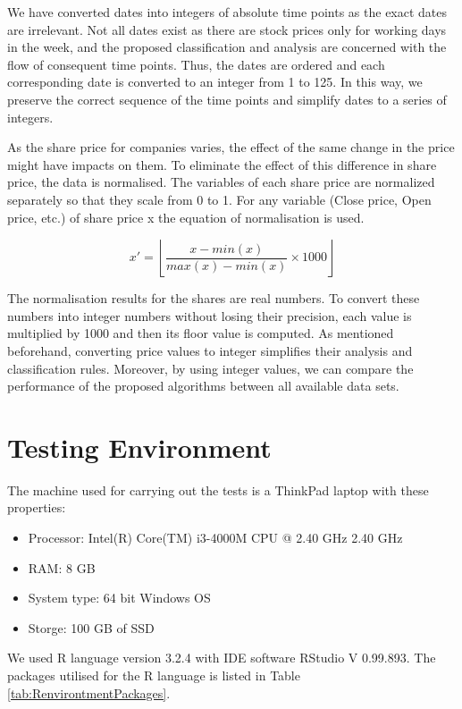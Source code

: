 We have converted dates into integers of absolute time points as the exact dates are irrelevant. Not all dates exist as there are stock prices only for working days in the week, and the proposed classification and analysis are concerned with the flow of consequent time points. Thus, the dates are ordered and each corresponding date is converted to an integer from 1 to 125. In this way, we preserve the correct sequence of the time points and simplify dates to a series of integers.

As the share price for companies varies, the effect of the same change in the price might have impacts on them. To eliminate the effect of this difference in share price, the data is normalised. The variables of each share price are normalized separately so that they scale from 0 to 1. For any variable (Close price, Open price, etc.) of share price x the equation of normalisation is used.

\begin{equation}
	{x}' = \left \lfloor \frac{x - min(x)}{max(x) - min(x)} \times 1000 \right \rfloor
\end{equation} 

The normalisation results for the shares are real numbers. To convert these numbers into integer numbers without losing their precision, each value is multiplied by 1000 and then its floor value is computed. As mentioned beforehand, converting price values to integer simplifies their analysis and classification rules. Moreover, by using integer values, we can compare the performance of the proposed algorithms between all available data sets.

\section{Testing Environment}

The machine used for carrying out the tests is a ThinkPad laptop with these properties:
\begin{itemize}
	\item Processor: Intel(R) Core(TM) i3-4000M CPU @ 2.40 GHz 2.40 GHz
	\item RAM: 8 GB
	\item System type: 64 bit Windows OS
	\item Storge: 100 GB of SSD
\end{itemize}

We used R language version 3.2.4 with IDE software RStudio V 0.99.893. The packages utilised for the R language is listed in Table \ref{tab:RenvirontmentPackages}.

